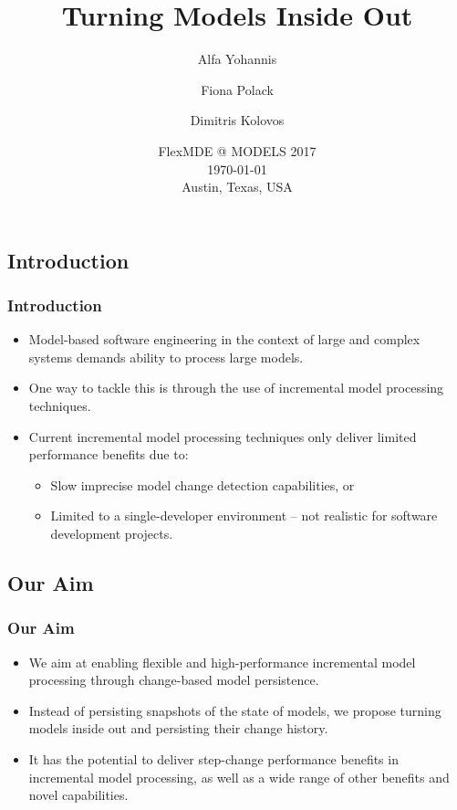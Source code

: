\documentclass{beamer}
\begin{document}
\title{Turning Models Inside Out}
\author[Alfa, Yohannis] %
{Alfa Yohannis\and Fiona Polack \and Dimitris Kolovos}
\date[]{\scriptsize
FlexMDE @ MODELS 2017\\
        \today\\
        Austin, Texas, USA
}

\frame{\titlepage}

\begin{frame}
\section{Introduction}
\frametitle{Introduction}
\begin{itemize}
    \item Model-based software engineering in the context of large and complex systems demands ability to process large models.
    \item One way to tackle this is through the use of incremental model processing techniques.
    \item Current incremental model processing techniques only deliver limited performance benefits due to:
    \begin{itemize}
        \item Slow imprecise model change detection capabilities, or
        \item Limited to a single-developer environment -- not realistic for software development projects.
    \end{itemize}    
\end{itemize}
\note{
        
}
\end{frame}
  
\begin{frame}
\section{Our Aim}
\frametitle{Our Aim}
\begin{itemize}
\item We aim at enabling flexible and high-performance incremental model processing through change-based model persistence.
\item Instead of persisting snapshots of the state of models, we propose turning models inside out and persisting their change history.
\item It has the potential to deliver step-change performance benefits in incremental model processing, as well as a wide range of other benefits and novel capabilities.
\end{itemize}  
\end{frame}
\end{document}
